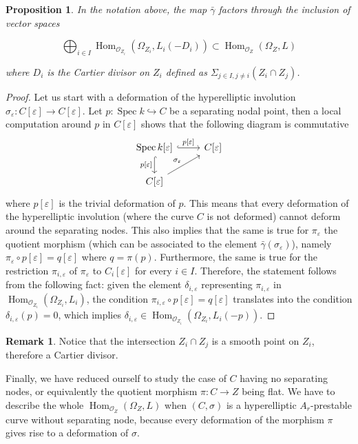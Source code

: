 \documentclass{alggeom}
\numberwithin{equation}{section}
\numberwithin{subsection}{section}
\newtheorem{proposition}[theorem]{Proposition}
\theoremstyle{definition}
\newtheorem{remark}[theorem]{Remark}
\theoremstyle{remark}
\newcommand\cO{\mathcal{O}} \newcommand\cP{\mathcal{P}}
\renewcommand\hom{\operatorname{Hom}}
\newcommand\spec{\operatorname{Spec}}
\renewcommand{\epsilon}{\varepsilon}
\begin{document}
\begin{proposition}
  In the notation above, the map $\bar{\gamma}$ factors through the inclusion of vector spaces
  
  $$ \bigoplus_{i\in I}\hom_{\cO_{Z_i}}(\Omega_{Z_i},L_i(-D_i)) \subset \hom_{\cO_Z}(\Omega_Z, L) $$
  
  where $D_i$ is the Cartier divisor on $Z_i$ defined as $\Sigma_{j \in I, j\neq i} (Z_i \cap Z_j)$.
\end{proposition}
\begin{proof}
	Let us start with a deformation of the hyperelliptic involution $\sigma_{\epsilon}:C[\epsilon]\rightarrow C[\epsilon]$. Let $p:\spec k \hookrightarrow C$ be a separating nodal point, then a local computation around $p$ in $C[\epsilon]$ shows that the following diagram is commutative
	$$\begin{tikzcd}
	{\spec k[\epsilon]} \arrow[r, "{p[\epsilon]}", hook] \arrow[d, "{p[\epsilon]}"', hook] & {C[\epsilon]} \\
	{C[\epsilon]} \arrow[ru, "\sigma_{\epsilon}"]                                          &              
	\end{tikzcd}$$
	where $p[\epsilon]$ is the trivial deformation of $p$. This means that every deformation of the hyperelliptic involution (where the curve $C$ is not deformed) cannot deform around the separating nodes. This also implies that the same is true for $\pi_{\epsilon}$ the quotient morphism (which can be associated to the element $\bar{\gamma}(\sigma_{\epsilon})$), namely $\pi_{\epsilon}\circ p[\epsilon]= q[\epsilon]$ where $q=\pi(p)$. Furthermore, the same is true for the restriction $\pi_{i,\epsilon}$ of $\pi_{\epsilon}$ to $C_i[\epsilon]$ for every $i \in I$. Therefore, the statement follows from the following fact: given the element $\delta_{i,\epsilon}$ representing $\pi_{i,\epsilon}$ in $\hom_{\cO_{Z_i}}(\Omega_{Z_i},L_i)$, the condition $ \pi_{i,\epsilon}\circ p[\epsilon]= q[\epsilon]$ translates into the condition $\delta_{i,\epsilon}(p)=0$, which implies $\delta_{i,\epsilon} \in \hom_{\cO_{Z_i}}(\Omega_{Z_i},L_i(-p))$. 
\end{proof}

\begin{remark}
		Notice that the intersection $Z_i \cap Z_j$ is a smooth point on $Z_i$, therefore a Cartier divisor.
\end{remark}

Finally, we have reduced ourself to study the case of $C$ having no separating nodes, or equivalently the quotient morphism $\pi:C \rightarrow Z$ being flat. We have to describe the whole $\hom_{\cO_Z}(\Omega_{Z},L)$ when $(C,\sigma)$ is a hyperelliptic $A_r$-prestable curve without separating node, because every deformation of the morphism $\pi$ gives rise to a deformation of $\sigma$. 
\end{document}

